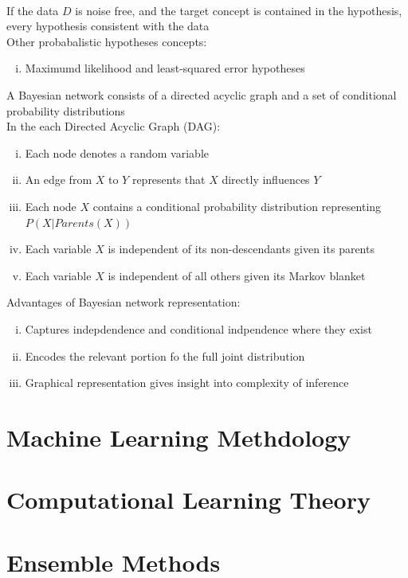 \documentclass{article}
\begin{document}
		\\
		If the data $D$ is noise free, and the target concept is contained in the hypothesis, every hypothesis consistent with the data \\
		Other probabalistic hypotheses concepts:
		\begin{enumerate}[(i)]
			\item Maximumd likelihood and least-squared error hypotheses
			\end{enumerate}
		A Bayesian network consists of a directed acyclic graph and a set of conditional probability distributions \\
		In the each Directed Acyclic Graph (DAG):
		\begin{enumerate}[(i)]
			\item Each node denotes a random variable
			\item An edge from $X$ to $Y$ represents that $X$ directly influences $Y$
			\item Each node $X$ contains a conditional probability distribution representing $P(X|Parents(X))$
			\item Each variable $X$ is independent of its non-descendants given its parents
			\item Each variable $X$ is independent of all others given its Markov blanket
			\end{enumerate}
		Advantages of Bayesian network representation:
		\begin{enumerate}[(i)]
			\item Captures indepdendence and conditional indpendence where they exist
			\item Encodes the relevant  portion fo the full joint distribution
			\item Graphical representation gives insight into complexity of inference
			\end{enumerate}
		\clearpage

	\section{Machine Learning Methdology}
		\clearpage

	\section{Computational Learning Theory}
		\clearpage

	\section{Ensemble Methods}
		\clearpage
\end{document}
